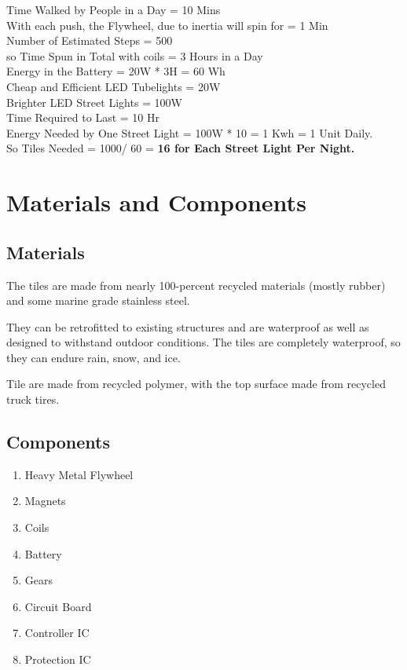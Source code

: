 \documentclass[11pt]{article}
\begin{document}
\noindent
Time Walked by People in a Day \hfill = 10 Mins\\
With each push, the Flywheel, due to inertia will spin for \hfill = 1 Min\\
Number of Estimated Steps \hfill = 500\\
so Time Spun in Total with coils \hfill = 3 Hours in a Day\\

\noindent
Energy in the Battery \hfill = 20W * 3H = 60 Wh\\
Cheap and Efficient LED Tubelights \hfill= 20W\\
Brighter LED Street Lights \hfill = 100W\\
Time Required to Last \hfill = 10 Hr\\
Energy Needed by One Street Light \hfill = 100W * 10 = 1 Kwh = 1 Unit Daily.\\
So Tiles Needed \hfill =  1000/ 60 = \textbf{16 for Each Street Light Per Night.}\\

\section{Materials and Components}
\subsection{Materials}
The tiles are made from nearly 100-percent recycled materials (mostly rubber) and some marine grade stainless steel. 

They can be retrofitted to existing structures and are waterproof as well as designed to withstand outdoor conditions. The tiles are completely waterproof, so they can endure rain, snow, and ice.

Tile are made from recycled polymer, with the top surface made from recycled truck tires.
\pagebreak

\subsection{Components}

\begin{enumerate}
	\item Heavy Metal Flywheel
	\item Magnets
	\item Coils
	\item Battery
	\item Gears
	\item Circuit Board
	\item Controller IC
	\item Protection IC
\end{enumerate}
\end{document}
